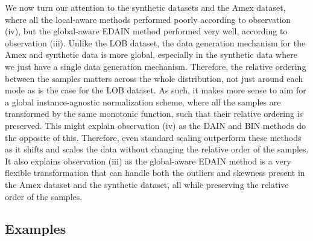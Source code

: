 \documentclass{statsmsc}
\begin{document}
{We now turn our attention to the synthetic datasets and the Amex dataset, where
all the local-aware methods performed poorly according to observation
(iv), but the global-aware \ac{EDAIN} method performed very well, according
to observation (iii).
Unlike the \ac{LOB} dataset, the data generation mechanism for the Amex and synthetic data
is more global, especially in the synthetic data where we just have a single
data generation mechanism. Therefore, the relative ordering between the samples matters across
the whole distribution, not just around each mode as is the case for the \ac{LOB} dataset.
As such, it makes more sense to aim for a global instance-agnostic
normalization scheme, where all the samples are transformed by the same monotonic function,
such that their relative ordering is preserved.
This might explain observation (iv) as the \ac{DAIN} and \ac{BIN} methods do the opposite of this.
Therefore, even standard scaling outperform these methods as it shifts and
scales the data without changing the relative order of the samples.
It also explains observation (iii) as the global-aware \ac{EDAIN} method is a very flexible
transformation that can handle both the outliers and skewness present in the Amex dataset and
the synthetic dataset, all while preserving the relative order of the samples.


\subsection{Examples}%
\label{sub:Examples}

}
\end{document}
